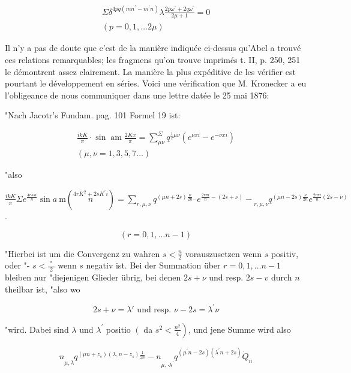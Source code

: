 \documentclass{article}
\begin{document}
\[
\begin{gathered}
\Sigma \delta^{4 p q\left(m n^{\prime}-m^{\prime} n\right)} \lambda \frac{2 p \omega^{\prime}+2 q \omega^{\prime}}{2 \mu+1}=0 \\
(p=0,1, \ldots 2 \mu)
\end{gathered}
\]

Il n'y a pas de doute que c'est de la manière indiquée ci-dessus qu'Abel a trouvé ces relations remarquables; les fragmens qu'on trouve imprimés t. II, p. 250, 251 le démontrent assez clairement. La manière la plus expéditive de les vérifier est pourtant le développement en séries. Voici une vérification que M. Kronecker a eu l'obligeance de nous communiquer dans une lettre datée le 25 mai 1876:

"Nach Jacotr's Fundam. pag. 101 Formel 19 ist:

\[
\begin{gathered}
\frac{i k K}{\pi} \cdot \sin \operatorname{am} \frac{2 K x}{\pi}=\sum_{\mu \nu}^{\Sigma} q^{\frac{1}{2} \mu \nu}\left(e^{\nu x i}-e^{-\nu x i}\right) \\
(\mu, \nu=1,3,5,7 \ldots)
\end{gathered}
\]

"also

\(\frac{i k K}{\pi} \Sigma e^{\frac{4 r s s i}{n}} \sin a \mathrm{~m}\left(\stackrel{4 r K^{2}+2 s K^{\prime} i}{n}\right)=\sum_{r, \mu, \nu} q^{(\mu n+2 s) \frac{\nu}{2 n}{ }_{-}} e^{\frac{2 r \pi i}{n}-(2 s+\nu)}-\underset{r, \mu, \nu}{ } q^{(\mu n-2 s) \frac{\nu}{2 n}} e^{\frac{2 r \pi i}{n}(2 s-\nu)}\).

\[
(r=0,1, \ldots n-1)
\]

"Hierbei ist um die Convergenz zu wahren \(s<\frac{n}{2}\) vorauszusetzen wenn \(s\) positiv, oder "- \(s<\frac{\text { " }}{2}\) wenn \(s\) negativ ist. Bei der Summation über \(r=0,1, \ldots n-1\) bleiben nur
"diejenigen Glieder übrig, bei denen \(2 s+\nu\) und resp. \(2 s-v\) durch \(n\) theilbar ist, "also wo

\[
2 s+\nu=\lambda \prime \text { und resp. } \nu-2 s=\lambda^{\prime} \nu
\]

"wird. Dabei sind \(\lambda\) und \(\lambda^{\prime}\) positio \(\left(\right.\) da \(\left.s^{2}<\frac{n^{2}}{4}\right)\), und jene Summe wird also

\[
n \underset{\mu, \lambda}{ } q^{\left(\mu n+z_{s}\right)\left(\lambda, n-z_{s}\right) \frac{1}{2 n}}-n \underset{\mu, \cdot \lambda^{\prime}}{ } q^{\left(\mu^{\prime} n-2 s\right)\left(\lambda^{\prime} n+2 s\right)} \dot{Q}_{n}
\]
\end{document}
